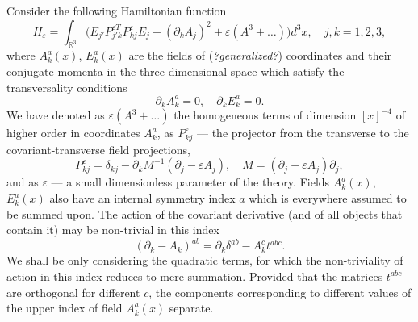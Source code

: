 \documentclass[12pt]{article}
\newcommand{\pl}{\partial}
\newcommand{\RR}{\mathbb{R}}
\newcommand{\ve}{\varepsilon}
\begin{document}
	Consider the following Hamiltonian function
\begin{equation}
\label{qH3}
    H_{\ve}
    = \int_{\RR^{3}} \bigl(E_{j'}P_{j'k}^{\ve T}P_{kj}^{\ve}
	E_{j} + (\pl_{k} A_{j})^{2}
	+ \ve (A^{3}+\ldots) \bigr) d^{3}x ,\quad j,k= 1,2,3,
\end{equation}
    where
$ A_{k}^{a}(x) $,
$ E_{k}^{a}(x) $ are the fields of ({\it ?generalized?}) coordinates and their conjugate momenta
	in the three-dimensional space which satisfy the transversality conditions
\begin{equation}
\label{transAE}
    \pl_{k} A_{k}^{a} = 0, \quad 
    \pl_{k} E_{k}^{a} = 0 .
\end{equation}
	We have denoted as 
$ \ve (A^{3}+\ldots) $
	the homogeneous terms of dimension
$ [x]^{-4} $
	of higher order in coordinates
$ A_{k}^{a} $,
	as
$ P_{kj}^{\ve} $ --- the projector from the transverse
	to the covariant-transverse field projections,
\begin{equation*}
    P_{kj}^{\ve}
	= \delta_{kj} - \pl_{k} M^{-1} (\pl_{j}-\ve A_{j}),
	\quad M = (\pl_{j} - \ve A_{j}) \pl_{j} ,
\end{equation*}
    and as
$ \ve $ --- a small dimensionless parameter of the theory.
	Fields
$ A_{k}^{a}(x) $,
$ E_{k}^{a}(x) $
	also have an internal symmetry index
$ a $
	which is everywhere assumed to be summed upon.
	The action of the covariant derivative (and of all objects that contain it)
	may be non-trivial in this index
\begin{equation*}
    (\pl_{k}-A_{k})^{ab} = \pl_{k} \delta^{ab} - A_{k}^{c} t^{abc} .
\end{equation*}
	We shall be only considering the quadratic terms, for which the non-triviality
	of action in this index reduces to mere summation.
	Provided that the matrices 
$ t^{abc} $
	are orthogonal for different
$ c $,
	the components corresponding to different values of the upper index of field
$ A_{k}^{a}(x) $
	separate.
\end{document}
